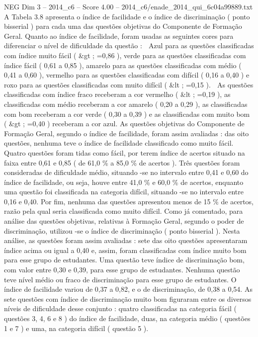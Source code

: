 \begin{textsample}{NEG Dim 3 – 2014\_c6 – Score 4.00 – 2014\_c6/enade\_2014\_qui\_6c04a99889.txt}
A Tabela 3.8 apresenta o índice de facilidade e o índice de discriminação ( ponto bisserial ) para cada uma das questões objetivas do Componente de Formação Geral.
Quanto ao índice de facilidade, foram usadas as seguintes cores para diferenciar o nível de dificuldade da questão :  Azul para as questões classificadas com índice muito fácil ( \&gt ; =0,86 ), verde para as questões classificadas com índice fácil ( 0,61 a 0,85 ), amarelo para as questões classificadas com médio ( 0,41 a 0,60 ), vermelho para as questões classificadas com difícil ( 0,16 a 0,40 ) e roxo para as questões classificadas com muito difícil ( \&lt ; =0,15 ).  As questões classificadas com índice fraco receberam a cor vermelho ( \&lt ; =0,19 ), as classificadas com médio receberam a cor amarelo ( 0,20 a 0,29 ), as classificadas com bom receberam a cor verde ( 0,30 a 0,39 ) e as classificadas com muito bom ( \&gt ; =0,40 ) receberam a cor azul.
As questões objetivas do Componente de Formação Geral, segundo o índice de facilidade, foram assim avaliadas : das oito questões, nenhuma teve o índice de facilidade classificado como muito fácil.
Quatro questões foram tidas como fácil, por terem índice de acertos situado na faixa entre 0,61 e 0,85 ( de 61,0 \% a 85,0 \% de acertos ).
Três questões foram consideradas de dificuldade médio, situando -se no intervalo entre 0,41 e 0,60 do índice de facilidade, ou seja, houve entre 41,0 \% e 60,0 \% de acertos, enquanto uma questão foi classificada na categoria difícil, situando -se no intervalo entre 0,16 e 0,40.
Por fim, nenhuma das questões apresentou menos de 15 \% de acertos, razão pela qual seria classificada como muito difícil.
Como já comentado, para análise das questões objetivas, relativas à Formação Geral, segundo o poder de discriminação, utilizou -se o índice de discriminação ( ponto bisserial ).
Nesta análise, as questões foram assim avaliadas : sete das oito questões apresentaram índice acima ou igual a 0,40 e, assim, foram classificadas com índice muito bom para esse grupo de estudantes.
Uma questão teve índice de discriminação bom, com valor entre 0,30 e 0,39, para esse grupo de estudantes.
Nenhuma questão teve nível médio ou fraco de discriminação para esse grupo de estudantes.
O índice de facilidade variou de 0,37 a 0,82, e o de discriminação, de 0,38 a 0,54.
As sete questões com índice de discriminação muito bom figuraram entre os diversos níveis de dificuldade desse conjunto : quatro classificadas na categoria fácil ( questões 3, 4, 6 e 8 ) do índice de facilidade, duas, na categoria médio ( questões 1 e 7 ) e uma, na categoria difícil ( questão 5 ).

\end{textsample}

